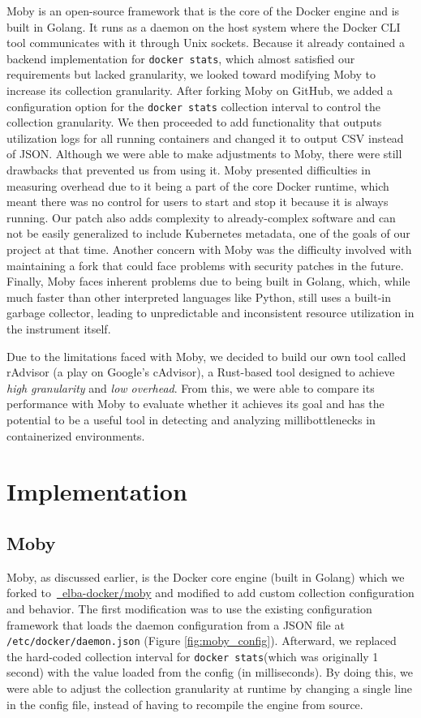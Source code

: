 \documentclass[a4paper,11pt]{article}
\newcommand{\github}[2]{\,\href{https://github.com/#1/#2}{\faGithub~#1/\linebreak[0]#2}\xspace}
\newcommand{\filepath}[1]{\texttt{#1}\xspace}
\newcommand{\granularity}{\textit{high granularity}\xspace}
\newcommand{\overhead}{\textit{low overhead}\xspace}
\newcommand{\dockerstats}{\texttt{docker stats}\xspace}
\begin{document}
Moby is an open-source framework that is the core of the Docker engine and is built in Golang. 
It runs as a daemon on the host system where the Docker CLI tool communicates with it through Unix sockets. 
Because it already contained a backend implementation for \dockerstats,
which almost satisfied our requirements but lacked granularity,
we looked toward modifying Moby to increase its collection granularity.
After forking Moby on GitHub, we added a configuration option for the \dockerstats collection interval
to control the collection granularity.
We then proceeded to add functionality that outputs utilization logs for all running containers
and changed it to output CSV instead of JSON.
Although we were able to make adjustments to Moby,
there were still drawbacks that prevented us from using it.
Moby presented difficulties in measuring overhead due to it being a part of the core Docker runtime,
which meant there was no control for users to start and stop it because it is always running.
Our patch also adds complexity to already-complex software and can not be easily generalized to include Kubernetes metadata,
one of the goals of our project at that time.
Another concern with Moby was the difficulty involved with maintaining a fork
that could face problems with security patches in the future.
Finally, Moby faces inherent problems due to being built in Golang,
which, while much faster than other interpreted languages like Python,
still uses a built-in garbage collector,
leading to unpredictable and inconsistent resource utilization in the instrument itself.

Due to the limitations faced with Moby, we decided to build our own tool called rAdvisor (a play on Google's cAdvisor),
a Rust-based tool designed to achieve \granularity and \overhead.
From this, we were able to compare its performance with Moby to evaluate whether it achieves its goal
and has the potential to be a useful tool in detecting and analyzing millibottlenecks in containerized environments.
 
\section{Implementation}

\subsection{Moby}

Moby, as discussed earlier, is the Docker core engine (built in Golang) which we forked to \github{elba-docker}{moby}
and modified to add custom collection configuration and behavior.
The first modification was to use the existing configuration framework
that loads the daemon configuration from a JSON file at \filepath{/etc/docker/daemon.json} (Figure \ref{fig:moby_config}).
Afterward, we replaced the hard-coded collection interval for \dockerstats (which was originally 1 second)
with the value loaded from the config (in milliseconds).
By doing this, we were able to adjust the collection granularity at runtime by changing a single line in the config file,
instead of having to recompile the engine from source.
\end{document}
